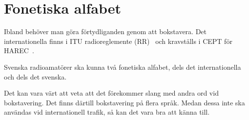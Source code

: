 \section{Fonetiska alfabet}
\label{fonetiska_alfabet}

Ibland behöver man göra förtydliganden genom att bokstavera.
Det internationella finns i ITU radioreglemente (RR)~\cite[Appendix 14]{ITU-RR}
och kravställs i CEPT för HAREC~\cite[Annex 6]{TR6102}.

Svenska radioamatörer ska kunna två fonetiska alfabet, dels det
internationella och dels det svenska.

Det kan vara värt att veta att det förekommer slang med andra ord vid
bokstavering.
Det finns därtill bokstavering på flera språk.
Medan dessa inte ska användas vid internationell trafik, så kan det vara bra
att känna till.

